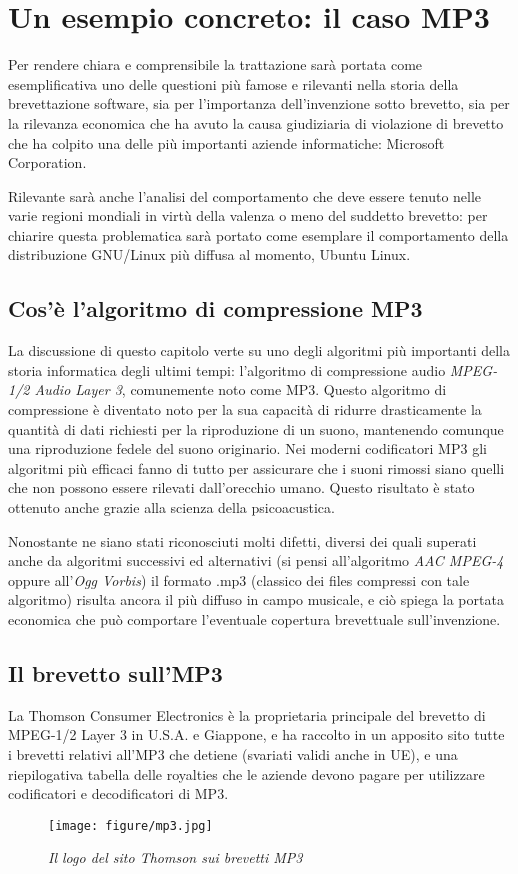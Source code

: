 \chapter{Un esempio concreto: il caso MP3}
Per rendere chiara e comprensibile la trattazione sarà portata come esemplificativa uno delle questioni più famose e rilevanti nella storia della brevettazione software, sia per l'importanza dell'invenzione sotto brevetto, sia per la rilevanza economica che ha avuto la causa giudiziaria di violazione di brevetto che ha colpito una delle più importanti aziende informatiche: Microsoft Corporation.

Rilevante sarà anche l'analisi del comportamento che deve essere tenuto nelle varie regioni mondiali in virtù della valenza o meno del suddetto brevetto: per chiarire questa problematica sarà portato come esemplare il comportamento della distribuzione GNU/Linux più diffusa al momento, Ubuntu Linux\cite{ubuntu}.

\section{Cos'è l'algoritmo di compressione MP3}
La discussione di questo capitolo verte su uno degli algoritmi più importanti della storia informatica degli ultimi tempi: l'algoritmo di compressione audio \textit{MPEG-1/2 Audio Layer 3}, comunemente noto come MP3. Questo algoritmo di compressione è diventato noto per la sua capacità di ridurre drasticamente la quantità di dati richiesti per la riproduzione di un suono, mantenendo comunque una riproduzione fedele del suono originario. Nei moderni codificatori MP3 gli algoritmi più efficaci fanno di tutto per assicurare che i suoni rimossi siano quelli che non possono essere rilevati dall'orecchio umano. Questo risultato è stato ottenuto anche grazie alla scienza della psicoacustica.

Nonostante ne siano stati riconosciuti molti difetti, diversi dei quali superati anche da algoritmi successivi ed alternativi (si pensi all'algoritmo \textit{AAC MPEG-4} oppure all'\textit{Ogg Vorbis}) il formato .mp3 (classico dei files compressi con tale algoritmo) risulta ancora il più diffuso in campo musicale, e ciò spiega la portata economica che può comportare l'eventuale copertura brevettuale sull'invenzione.
\section{Il brevetto sull'MP3}\label{mp3-patent}
La Thomson Consumer Electronics è la proprietaria principale del brevetto di MPEG-1/2 Layer 3 in U.S.A. e Giappone, e ha raccolto in un apposito sito tutte i brevetti relativi all'MP3 che detiene (svariati validi anche in UE), e una riepilogativa tabella delle royalties che le aziende devono pagare per utilizzare codificatori e decodificatori di MP3.
\begin{figure}[hb]
	\begin{center}
		\texttt{[image: figure/mp3.jpg]}
	\end{center}
	\caption{\textit{Il logo del sito Thomson sui brevetti MP3}}
\end{figure}
